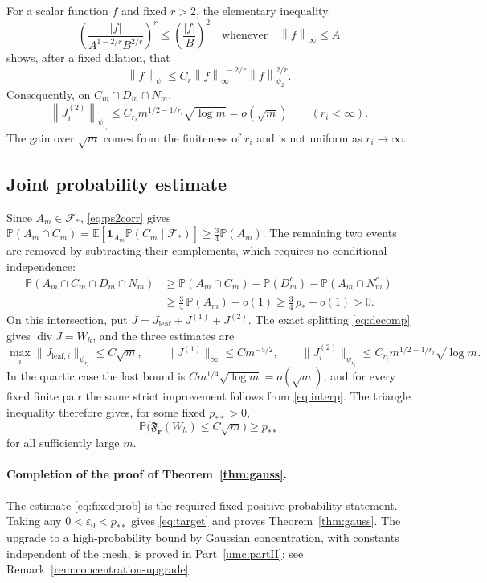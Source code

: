 \documentclass[11pt]{article}
\theoremstyle{definition}
\theoremstyle{remark}
\numberwithin{equation}{section}
\newcommand{\E}{\mathbb E}
\newcommand{\F}{\mathcal F}
\newcommand{\divv}{\operatorname{div}}
\newcommand{\one}{\mathbf 1}
\newcommand{\norm}[1]{\left\|#1\right\|}
\begin{document}
For a scalar function $f$ and fixed $r>2$, the elementary
inequality
\[
 \left(\frac{|f|}{A^{1-2/r}B^{2/r}}\right)^r
 \le \left(\frac{|f|}{B}\right)^2
 \quad\text{whenever}\quad \norm f_\infty\le A
\]
shows, after a fixed dilation, that
\[
 \norm f_{\psi_r}\le C_r
 \norm f_\infty^{1-2/r}\norm f_{\psi_2}^{2/r}.
\]
Consequently, on $C_m\cap D_m\cap N_m$,
\begin{equation}\label{eq:interp}
 \norm{J^{(2)}_i}_{\psi_{r_i}}
 \le C_{r_i}m^{1/2-1/r_i}\sqrt{\log m}
 =o(\sqrt m)\qquad (r_i<\infty).
\end{equation}
The gain over $\sqrt m$ comes from the finiteness of $r_i$ and is not
uniform as $r_i\to\infty$.

\subsection{Joint probability estimate}
Since $A_m\in\mathcal F_*$, \eqref{eq:ps2corr} gives
$\mathbb P(A_m\cap C_m)=\E[\one_{A_m}\mathbb P(C_m\mid\F_*)]
\ge\frac34\mathbb P(A_m)$. The remaining two events are removed by
subtracting their complements, which requires no conditional
independence:
\begin{align*}
 \mathbb P(A_m\cap C_m\cap D_m\cap N_m)
 &\ge\mathbb P(A_m\cap C_m)
      -\mathbb P(D_m^c)-\mathbb P(A_m\cap N_m^c)\\
 &\ge\tfrac34\,\mathbb P(A_m)-o(1)
 \ge\tfrac34\,p_*-o(1)>0.
\end{align*}
On this intersection, put
$J=J_{\mathrm{leaf}}+J^{(1)}+J^{(2)}$. The exact splitting
\eqref{eq:decomp} gives $\divv J=W_h$, and the three estimates are
\[
 \max_i\|J_{\mathrm{leaf},i}\|_{\psi_{r_i}}\le C\sqrt m,
 \qquad \|J^{(1)}\|_\infty\le C m^{-5/2},
 \qquad
 \|J^{(2)}_i\|_{\psi_{r_i}}
       \le C_{r_i}m^{1/2-1/r_i}\sqrt{\log m}.
\]
In the quartic case the last bound is
$C m^{1/4}\sqrt{\log m}=o(\sqrt m)$, and for every fixed finite
pair the same strict improvement follows from \eqref{eq:interp}.
The triangle inequality therefore gives, for some fixed $p_{**}>0$,
\begin{equation}\label{eq:fixedprob}
 \mathbb P\bigl(\mathfrak F_{\boldsymbol r}(W_h)
                         \le C\sqrt m\bigr)\ge p_{**}
\end{equation}
for all sufficiently large $m$.

\paragraph{Completion of the proof of Theorem~\ref{thm:gauss}.}
The estimate \eqref{eq:fixedprob} is the required
fixed-positive-probability statement. Taking any
$0<\varepsilon_0<p_{**}$ gives \eqref{eq:target} and
proves Theorem~\ref{thm:gauss}. The upgrade to a high-probability
bound by Gaussian concentration, with constants independent of the
mesh, is proved in Part~\ref{umc:partII}; see
Remark~\ref{rem:concentration-upgrade}.
\end{document}
